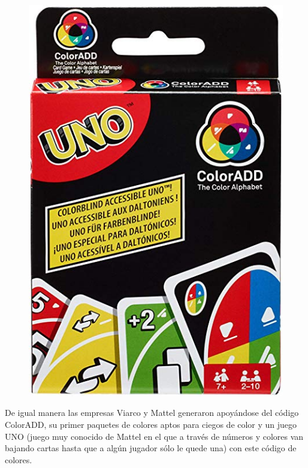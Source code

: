 \documentclass[10pt]{article}
\begin{document}
\begin{figure}[H]
	\begin{center}
\includegraphics[scale = 0.25]{Imagenes/UNO.jpg}
	\end{center} 
\end{figure}

De igual manera las empresas Viarco y Mattel generaron apoyándose del código ColorADD, su primer paquetes de colores aptos para ciegos de color y un juego UNO (juego muy conocido de Mattel en el que a través de números y colores van bajando cartas hasta que a algún jugador sólo le quede una) con este código de colores.   
\end{document}
